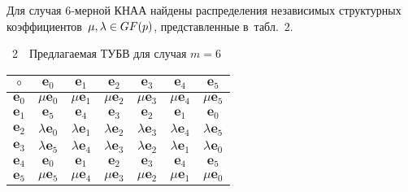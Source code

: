 \begin{multicols}{2}
  Для случая 6-мер\-ной КНАА найдены распределения независимых 
структурных коэффициентов~$\mu, \lambda \hm\in GF(p)$, представленные 
в~табл.~2.

\vspace*{6pt} %

\begin{center}
\noindent
{{\tablename~2}\ \ \small{Предлагаемая ТУБВ для случая $m = 6$}}

\vspace*{6pt}

\tabcolsep=8pt
{\small
 \begin{tabular}{|c|c|c|c|c|c|c|}
  \hline
$\circ$&$\mathbf{e}_0$&$\mathbf{e}_1$&$\mathbf{e}_2$&$\mathbf{e}_3$&
$\mathbf{e}_4$&$\mathbf{e}_5$\\
\hline
$\mathbf{e}_0$&$\mu \mathbf{e}_0$&$\mu \mathbf{e}_1$&
$\mu \mathbf{e}_2$&$\mu \mathbf{e}_3$&$\mu \mathbf{e}_4$&$\mu \mathbf{e}_5$\\
\hline
$\mathbf{e}_1$&$\mathbf{e}_5$&$\mathbf{e}_4$&$\mathbf{e}_3$&$\mathbf{e}_2$&
$\mathbf{e}_1$&$\mathbf{e}_0$\\
\hline
$\mathbf{e}_2$&$\lambda \mathbf{e}_0$&$\lambda \mathbf{e}_1$&$\lambda 
\mathbf{e}_2$&$\lambda \mathbf{e}_3$&$\lambda\mathbf{e}_4$&$\lambda 
\mathbf{e}_5$\\
\hline
$\mathbf{e}_3$&$\lambda\mathbf{e}_5$&$\lambda\mathbf{e}_4$&$\lambda\mathbf{e}_3
$&$\lambda\mathbf{e}_2$&$\lambda\mathbf{e}_1$&$\lambda \mathbf{e}_0$\\
\hline
$\mathbf{e}_4$&$\mathbf{e}_0$&$\mathbf{e}_1$&$\mathbf{e}_2$&$\mathbf{e}_3$&
$\mathbf{e}_4$&$\mathbf{e}_5$\\
\hline
$\mathbf{e}_5$&$\mu \mathbf{e}_5$&$\mu\mathbf{e}_4$&$\mu 
\mathbf{e}_3$&$\mu\mathbf{e}_2$&$\mu \mathbf{e}_1$&$\mu \mathbf{e}_0$\\
\hline
\end{tabular}
}
\end{center}

\vspace*{3pt}

  

  
  

\end{multicols}
